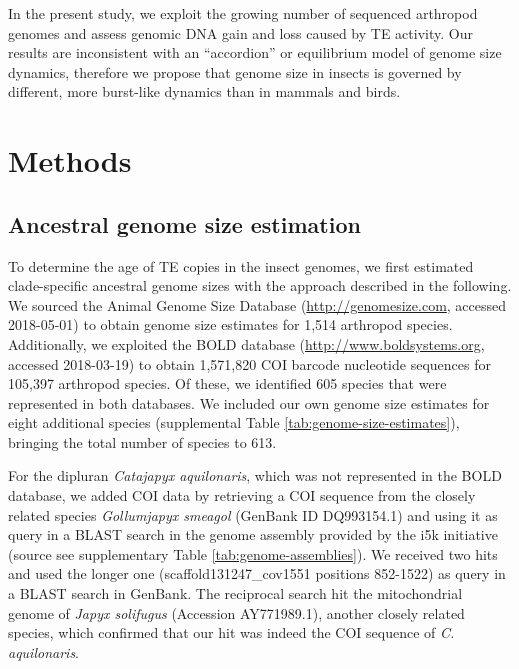 In the present study, we exploit the growing number of sequenced
arthropod genomes and assess genomic DNA gain and loss caused by TE
activity. Our results are inconsistent with an ``accordion'' or
equilibrium model of genome size dynamics, therefore we propose that
genome size in insects is governed by different, more burst-like
dynamics than in mammals and birds.

\section{Methods}

\subsection*{Ancestral genome size
estimation}

To determine the age of TE copies in the insect genomes, we first
estimated clade-specific ancestral genome sizes with the approach
described in the following. We sourced the Animal Genome Size Database
\citep{Gregory2018} (\url{http://genomesize.com}, accessed 2018-05-01) to
obtain genome size estimates for 1,514 arthropod species. Additionally,
we exploited the BOLD database \citep{Ratnasingham2007}
(\url{http://www.boldsystems.org}, accessed 2018-03-19) to obtain
1,571,820 COI barcode nucleotide sequences for 105,397 arthropod
species. Of these, we identified 605 species that were represented in
both databases. We included our own genome size estimates for eight
additional species (supplemental Table \ref{tab:genome-size-estimates}), bringing the total number of
species to 613.

For the dipluran \emph{Catajapyx aquilonaris}, which was not represented
in the BOLD database, we added COI data by retrieving a COI sequence
from the closely related species \emph{Gollumjapyx smeagol} (GenBank ID
DQ993154.1) and using it as query in a BLAST search in the genome
assembly provided by the i5k initiative (source see supplementary Table
\ref{tab:genome-assemblies}). We received two hits and used the longer one
(scaffold131247\_cov1551 positions 852-1522) as query in a BLAST search
in GenBank. The reciprocal search hit the mitochondrial genome of
\emph{Japyx solifugus} (Accession AY771989.1), another closely related
species, which confirmed that our hit was indeed the COI sequence of
\emph{C. aquilonaris}.

